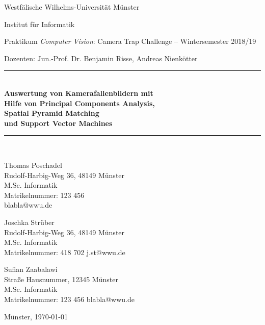 \begin{titlepage}
	\newcommand{\HRule}{\rule{\linewidth}{0.8mm}}
	
	Westfälische Wilhelms-Universität Münster
	
	Institut für Informatik
	
	Praktikum \textit{Computer Vision}: Camera Trap Challenge -- Wintersemester 2018/19 
	
	Dozenten: Jun.-Prof. Dr. Benjamin Risse, Andreas Nienkötter

	\center
 
 	
	\vspace{2cm}
	
	\HRule \\[0.5cm]
	{ \huge \sffamily\bfseries Auswertung von Kamerafallenbildern mit \\ Hilfe von Principal Components Analysis,\\ Spatial Pyramid Matching \\ und Support Vector Machines}\\[0.4cm]
	\HRule \\[0.5cm]
	
	\vspace{1cm}
	
	\vfill
	\flushright
	
	Thomas Poschadel \\
	Rudolf-Harbig-Weg 36, 48149 Münster \\
	M.Sc. Informatik \\
	Matrikelnummer: 123 456 \\
	blabla@wwu.de \\
	
	\vspace{2em}
	
	Joschka Strüber \\
	Rudolf-Harbig-Weg 36, 48149 Münster \\
	M.Sc. Informatik \\
	Matrikelnummer: 418 702
	j.st@wwu.de \\
	
	\vspace{2em}
	
	Sufian Zaabalawi \\
	Straße Hausnummer, 12345 Münster \\
	M.Sc. Informatik \\
	Matrikelnummer: 123 456
	blabla@wwu.de \\
	
	\vspace{2em}
	
	Münster, \today
	
	\restoregeometry
\end{titlepage}